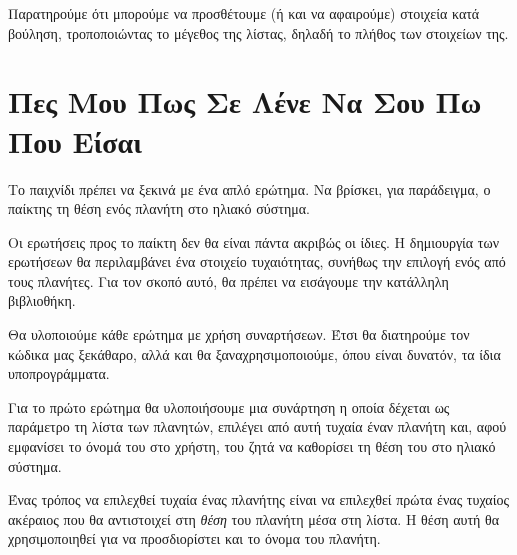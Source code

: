 \documentclass[a4paper,11pt,oneside]{book}
\begin{document}
Παρατηρούμε ότι μπορούμε να προσθέτουμε (ή και να αφαιρούμε) στοιχεία κατά βούληση, τροποποιώντας το μέγεθος της λίστας, δηλαδή το πλήθος των στοιχείων της.

\clearpage
\section{Πες Μου Πως Σε Λένε Να Σου Πω Που Είσαι}

\begin{question}
Το παιχνίδι πρέπει να ξεκινά με ένα απλό ερώτημα. Να βρίσκει, για παράδειγμα, ο παίκτης τη θέση ενός πλανήτη στο ηλιακό σύστημα.
\end{question}

Οι ερωτήσεις προς το παίκτη δεν θα είναι πάντα ακριβώς οι ίδιες. Η δημιουργία των ερωτήσεων θα περιλαμβάνει ένα στοιχείο τυχαιότητας, συνήθως την 
επιλογή ενός από τους πλανήτες. Για τον σκοπό αυτό, θα πρέπει να εισάγουμε την κατάλληλη βιβλιοθήκη.


Θα υλοποιούμε κάθε ερώτημα με χρήση συναρτήσεων. Έτσι θα διατηρούμε τον κώδικα μας ξεκάθαρο, αλλά και θα ξαναχρησιμοποιούμε, όπου είναι δυνατόν, τα ίδια υποπρογράμματα.

Για το πρώτο ερώτημα θα υλοποιήσουμε μια συνάρτηση η οποία δέχεται ως παράμετρο τη λίστα των πλανητών, επιλέγει από αυτή τυχαία έναν πλανήτη και, αφού εμφανίσει το όνομά του στο χρήστη, του ζητά να καθορίσει τη θέση του στο ηλιακό σύστημα. 

Ένας τρόπος να επιλεχθεί τυχαία ένας πλανήτης είναι να επιλεχθεί πρώτα ένας τυχαίος ακέραιος που θα αντιστοιχεί στη \emph{θέση} του πλανήτη μέσα στη λίστα. Η θέση αυτή θα χρησιμοποιηθεί για να προσδιορίστει και το όνομα του πλανήτη.


\end{document}
